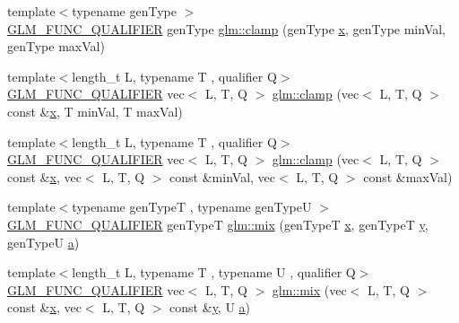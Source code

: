 \begin{DoxyCompactItemize}
\item 
{\footnotesize template$<$typename gen\+Type $>$ }\\\hyperlink{setup_8hpp_a33fdea6f91c5f834105f7415e2a64407}{G\+L\+M\+\_\+\+F\+U\+N\+C\+\_\+\+Q\+U\+A\+L\+I\+F\+I\+ER} gen\+Type \hyperlink{group__core__func__common_ga93bce26c7d80d30a62f5c508f8498a6c}{glm\+::clamp} (gen\+Type \hyperlink{_s_d_l__opengl_8h_ad0e63d0edcdbd3d79554076bf309fd47}{x}, gen\+Type min\+Val, gen\+Type max\+Val)
\item 
{\footnotesize template$<$length\+\_\+t L, typename T , qualifier Q$>$ }\\\hyperlink{setup_8hpp_a33fdea6f91c5f834105f7415e2a64407}{G\+L\+M\+\_\+\+F\+U\+N\+C\+\_\+\+Q\+U\+A\+L\+I\+F\+I\+ER} vec$<$ L, T, Q $>$ \hyperlink{group__core__func__common_gabff13e6547edac08f52b4133ff4bf183}{glm\+::clamp} (vec$<$ L, T, Q $>$ const \&\hyperlink{_s_d_l__opengl_8h_ad0e63d0edcdbd3d79554076bf309fd47}{x}, T min\+Val, T max\+Val)
\item 
{\footnotesize template$<$length\+\_\+t L, typename T , qualifier Q$>$ }\\\hyperlink{setup_8hpp_a33fdea6f91c5f834105f7415e2a64407}{G\+L\+M\+\_\+\+F\+U\+N\+C\+\_\+\+Q\+U\+A\+L\+I\+F\+I\+ER} vec$<$ L, T, Q $>$ \hyperlink{group__core__func__common_ga748333282a6f2f87762c0a4739c8c364}{glm\+::clamp} (vec$<$ L, T, Q $>$ const \&\hyperlink{_s_d_l__opengl_8h_ad0e63d0edcdbd3d79554076bf309fd47}{x}, vec$<$ L, T, Q $>$ const \&min\+Val, vec$<$ L, T, Q $>$ const \&max\+Val)
\item 
{\footnotesize template$<$typename gen\+TypeT , typename gen\+TypeU $>$ }\\\hyperlink{setup_8hpp_a33fdea6f91c5f834105f7415e2a64407}{G\+L\+M\+\_\+\+F\+U\+N\+C\+\_\+\+Q\+U\+A\+L\+I\+F\+I\+ER} gen\+TypeT \hyperlink{group__core__func__common_ga8e93f374aae27d1a88b921860351f8d4}{glm\+::mix} (gen\+TypeT \hyperlink{_s_d_l__opengl_8h_ad0e63d0edcdbd3d79554076bf309fd47}{x}, gen\+TypeT \hyperlink{_s_d_l__opengl_8h_a1675d9d7bb68e1657ff028643b4037e3}{y}, gen\+TypeU \hyperlink{_s_d_l__opengl__glext_8h_a3309789fc188587d666cda5ece79cf82}{a})
\item 
{\footnotesize template$<$length\+\_\+t L, typename T , typename U , qualifier Q$>$ }\\\hyperlink{setup_8hpp_a33fdea6f91c5f834105f7415e2a64407}{G\+L\+M\+\_\+\+F\+U\+N\+C\+\_\+\+Q\+U\+A\+L\+I\+F\+I\+ER} vec$<$ L, T, Q $>$ \hyperlink{group__core__func__common_gac18f8fdaae00f0a27a4d01d3aa507aad}{glm\+::mix} (vec$<$ L, T, Q $>$ const \&\hyperlink{_s_d_l__opengl_8h_ad0e63d0edcdbd3d79554076bf309fd47}{x}, vec$<$ L, T, Q $>$ const \&\hyperlink{_s_d_l__opengl_8h_a1675d9d7bb68e1657ff028643b4037e3}{y}, U \hyperlink{_s_d_l__opengl__glext_8h_a3309789fc188587d666cda5ece79cf82}{a})

\end{DoxyCompactItemize}

